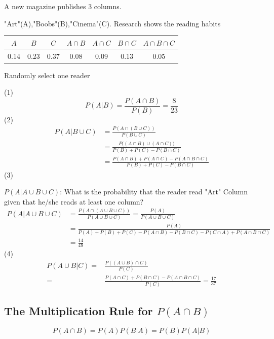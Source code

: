 \begin{exmp}
A new magazine publishes 3 columns.

"Art"(A),"Boobs"(B),"Cinema"(C).
Research shows the reading habits

\begin{center}
\begin{tabular}{ccccccc}
\hline
$A$ & $B$ & $C$ & $A\cap B$ & $A\cap C$ & $B\cap C$ & $A \cap B\cap C$\\
\hline
0.14&0.23&0.37&0.08&0.09&0.13&0.05\\
\hline
\end{tabular}
\end{center}

Randomly select one reader

(1)
\[P(A|B)=\frac{P(A \cap B)}{P(B)}=\boxed{\frac{8}{23}}\]
(2)
\begin{align*}
P(A|B\cup C)&=\frac{P(A\cap (B\cup C) )}{P(B\cup C)}\\
&=\frac{P\big( (A\cap B)\cup(A \cap C) \big)}{P(B)+P(C)-P(B \cap C)}\\
&=\frac{P(A\cap B)+P(A\cap C)-P(A\cap B\cap C)}{P(B)+P(C)-P(B \cap C)}
\end{align*}
(3)

$P(A|A \cup B \cup C)$: What is the probability that the reader read "Art" Column given that  he/she reads at least one column?
\begin{align*}
P(A|A \cup B \cup C)&=\frac{P(A \cap (A \cup B \cup C) )}{P(A \cup B \cup C)}=\frac{P(A)}{P(A \cup B \cup C)}\\
&=\frac{P(A)}{P(A)+P(B)+P(C)-P(A \cap B)-P(B \cap C)-P(C \cap A)+P(A \cap B \cap C)}\\
&=\boxed{\frac{14}{49}}
\end{align*}
(4)
\begin{align*}
P(A \cup B |C)=&\frac{P((A \cup B)\cap C)}{P(C)}\\
=&\frac{P(A \cap C) +P(B \cap C)-P(A \cap B \cap C)}{P(C)}=\boxed{\frac{17}{37}}
\end{align*}

\end{exmp}

\subsection{The Multiplication Rule for $P(A\cap B)$}
\begin{prop}
\[P(A \cap B)=P(A)P(B|A)=P(B)P(A|B)\]
\end{prop}

